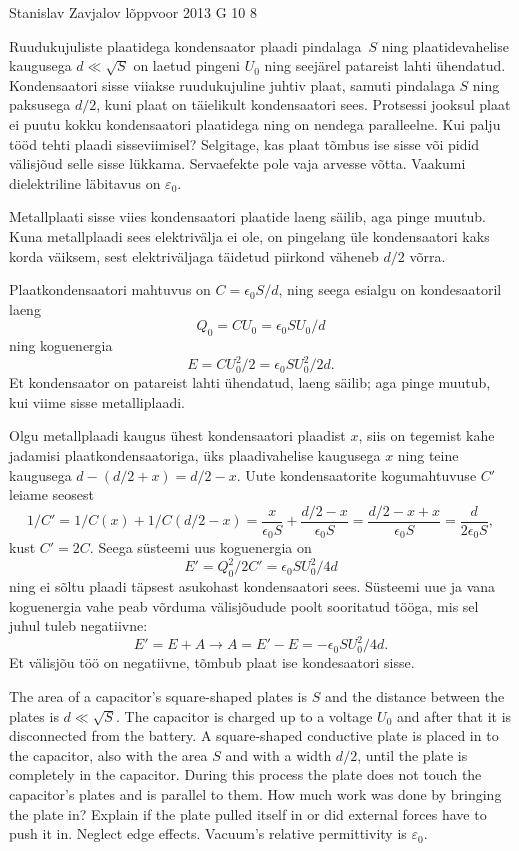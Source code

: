 {Stanislav Zavjalov} %
{lõppvoor} %
{2013} %
{G 10} %
{8} %
{
\ifStatement
Ruudukujuliste plaatidega kondensaator plaadi pindalaga~$S$ ning plaatidevahelise
kaugusega $d \ll \sqrt{S}$ on laetud pingeni $U_0$ ning seejärel
patareist lahti ühendatud. Kondensaatori sisse viiakse ruudukujuline juhtiv
plaat, samuti pindalaga $S$ ning paksusega $d/2$, kuni plaat on täielikult
kondensaatori sees. Protsessi jooksul plaat ei puutu kokku
kondensaatori plaatidega ning on nendega paralleelne. Kui palju tööd tehti
plaadi sisseviimisel? Selgitage, kas plaat tõmbus ise sisse või pidid välisjõud
selle sisse lükkama. Servaefekte pole vaja arvesse võtta. Vaakumi dielektriline
läbitavus on $\varepsilon_0$.
\fi


\ifHint
Metallplaati sisse viies kondensaatori plaatide laeng säilib, aga pinge muutub. Kuna metallplaadi sees elektrivälja ei ole, on pingelang üle kondensaatori kaks korda väiksem, sest elektriväljaga täidetud piirkond väheneb $d/2$ võrra.
\fi


\ifSolution
Plaatkondensaatori mahtuvus on $C = \epsilon_0 S / d$, ning seega esialgu on kondesaatoril laeng $$Q_0 = C U_0 = \epsilon_0 S U_0/ d$$ ning koguenergia $$E = C U_0^2 / 2 = \epsilon_0 S U_0^2/ 2 d.$$Et kondensaator on patareist lahti ühendatud, laeng säilib; aga pinge muutub, kui viime sisse metalliplaadi.

Olgu metallplaadi kaugus ühest kondensaatori plaadist $x$, siis on tegemist kahe jadamisi plaatkondensaatoriga, üks plaadivahelise kaugusega $x$ ning teine kaugusega $d - (d/2 + x) = d/2 - x$. Uute kondensaatorite kogumahtuvuse $C'$ leiame seosest $$1/C' = 1/C(x) + 1/C(d/2-x) = \frac{x}{\epsilon_0 S} + \frac{d/2 - x}{\epsilon_0 S} = \frac{d/2 - x + x}{\epsilon_0 S} = \frac{d}{2 \epsilon_0 S},$$kust $C' = 2C$. Seega süsteemi uus koguenergia on $$E' = Q_0^2 / 2C' = \epsilon_0 S U_0^2/ 4 d$$ ning ei sõltu plaadi täpsest asukohast kondensaatori sees. Süsteemi uue ja vana koguenergia vahe peab võrduma välisjõudude poolt sooritatud tööga, mis sel juhul tuleb negatiivne:
$$E' = E + A \rightarrow A = E' - E = - \epsilon_0 S U_0^2/ 4 d.$$
Et välisjõu töö on negatiivne, tõmbub plaat ise kondesaatori sisse.
\fi


\ifEngStatement
The area of a capacitor’s square-shaped plates is $S$ and the distance between the plates is $d \ll \sqrt{S}$. The capacitor is charged up to a voltage $U_0$ and after that it is disconnected from the battery. A square-shaped conductive plate is placed in to the capacitor, also with the area $S$ and with a width $d/2$, until the plate is completely in the capacitor. During this process the plate does not touch the capacitor’s plates and is parallel to them. How much work was done by bringing the plate in? Explain if the plate pulled itself in or did external forces have to push it in. Neglect edge effects. Vacuum’s relative permittivity is $\varepsilon_0$.
\fi


}
